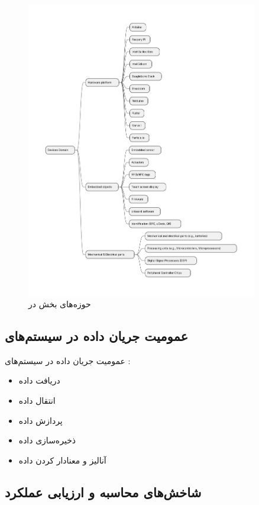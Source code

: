 \begin{figure}[H]
  \centering
  \includegraphics[width=0.9\textwidth]{./figures/IoT_devices_domains.pdf}
  \caption{حوزه‌های بخش  در }
  \label{fig:iotDevicesDomains}
\end{figure}

\subsection{عمومیت جریان داده در سیستم‌های }

عمومیت جریان داده در سیستم‌های :

\begin{itemize}
    \item دریافت داده
    \item انتقال داده
    \item پردازش داده
    \item ذخیره‌سازی داده
    \item آنالیز و معنادار کردن داده
\end{itemize}

\subsection{شاخش‌های محاسبه و ارزیابی عملکرد}

